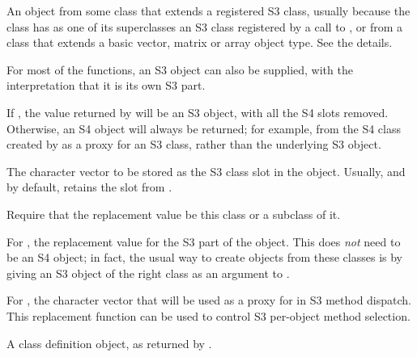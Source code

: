%
\begin{Arguments}
\begin{ldescription}

\item[\code{object}]  An object from some class that extends a registered
S3 class,
usually because the class has as
one of its superclasses an S3 class registered by a call to
, or from a class that extends a basic
vector, matrix or array object type.  See the details.

For most of the functions, an S3 object can also be supplied,
with the interpretation that it is its own S3 part.

\item[\code{strictS3}]   If , the value returned by
 will be an S3 object, with all the S4 slots
removed.  Otherwise, an S4 object will always
be returned; for example, from the S4 class created by
 as a proxy for an S3 class, rather than
the underlying S3 object.

\item[\code{S3Class}]  The character vector to be stored as the S3 class
slot in the object.  Usually, and by default, retains
the slot from .


\item[\code{needClass}] Require that the replacement value be this class or a
subclass of it.


\item[\code{value}]  For , the replacement value for the S3 part of the object.
This does \emph{not} need to be an S4 object; in fact, the
usual way to create objects from these classes is by giving an
S3 object of the right class as an argument to
.

For , the character vector that will be used as
a proxy for  in S3 method dispatch.  This
replacement function can be used to control S3 per-object method
selection.



\item[\code{classDef}]  A class definition object, as returned by .



\end{ldescription}
\end{Arguments}
%
